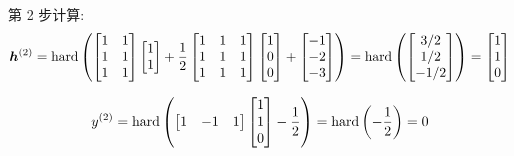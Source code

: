 \documentclass{article}
\begin{document}
第 2 步计算:
\begin{equation}
  \bm{h}^{(2)}
  =\operatorname{hard}\left(
    \begin{bmatrix}
      1 & 1 \\
      1 & 1 \\
      1 & 1 \\
    \end{bmatrix}
    \begin{bmatrix}
      1 \\ 1 \\
    \end{bmatrix}
    +\frac{1}{2}
    \begin{bmatrix}
      1 & 1 & 1 \\
      1 & 1 & 1 \\
      1 & 1 & 1 \\
    \end{bmatrix}
    \begin{bmatrix}
      1 \\ 0 \\ 0 \\
    \end{bmatrix}
    +
    \begin{bmatrix}
      -1 \\ -2 \\ -3 \\
    \end{bmatrix}
  \right)
  =\operatorname{hard}\left(
    \begin{bmatrix}
      3/2 \\ 1/2 \\ -1/2 \\
    \end{bmatrix}
  \right)
  =
  \begin{bmatrix}
    1 \\ 1 \\ 0 \\
  \end{bmatrix}
\end{equation}

\begin{equation}
  y^{(2)}
  =\operatorname{hard}\left(
    \begin{bmatrix}
      1 & -1 & 1 \\
    \end{bmatrix}
    \begin{bmatrix}
      1 \\ 1 \\ 0 \\
    \end{bmatrix}
    -\frac{1}{2}
  \right)
  =\operatorname{hard}\left(
    -\frac{1}{2}
  \right)
  =0
\end{equation}
\end{document}

